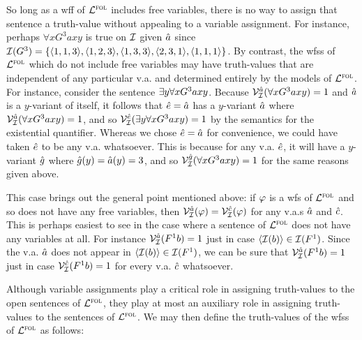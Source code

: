 So long as a wff of $\mathcal{L}^{\textsc{fol}}$ includes free variables, there is no way to assign that sentence a truth-value without appealing to a variable assignment.
For instance, perhaps $\forall xG^3axy$ is true on $\mathcal{I}$ given $\hat{a}$ since $\mathcal{I}(G^3)=\lbrace\langle1,1,3\rangle,\langle1,2,3\rangle,\langle1,3,3\rangle,\langle2,3,1\rangle,\langle1,1,1\rangle\rbrace$.
By contrast, the wfss of $\mathcal{L}^{\textsc{fol}}$ which do not include free variables may have truth-values that are independent of any particular v.a. and determined entirely by the models of $\mathcal{L}^{\textsc{fol}}$.
For instance, consider the sentence $\exists y\forall xG^3axy$.
Because $\mathcal{V}_{\mathcal{I}}^{\hat{a}}(\forall xG^3axy)=1$ and $\hat{a}$ is a $y$-variant of itself, it follows that $\hat{e}=\hat{a}$ has a $y$-variant $\hat{a}$ where $\mathcal{V}_{\mathcal{I}}^{\hat{a}}(\forall xG^3axy)=1$, and so $\mathcal{V}_{\mathcal{I}}^{\hat{e}}(\exists y\forall xG^3axy)=1$ by the semantics for the existential quantifier. 
Whereas we chose $\hat{e}=\hat{a}$ for convenience, we could have taken $\hat{e}$ to be any v.a. whatsoever. 
This is because for any v.a. $\hat{e}$, it will have a $y$-variant $\hat{g}$ where $\hat{g}(y)=\hat{a}(y)=3$, and so $\mathcal{V}_{\mathcal{I}}^{\hat{g}}(\forall xG^3axy)=1$ for the same reasons given above. 

This case brings out the general point mentioned above: if $\varphi$ is a wfs of $\mathcal{L}^{\textsc{fol}}$ and so does not have any free variables, then $\mathcal{V}_{\mathcal{I}}^{\hat{a}}(\varphi)=\mathcal{V}_{\mathcal{I}}^{\hat{c}}(\varphi)$ for any v.a.s $\hat{a}$ and $\hat{c}$.
This is perhaps easiest to see in the case where a sentence of $\mathcal{L}^{\textsc{fol}}$ does not have any variables at all.
For instance $\mathcal{V}_{\mathcal{I}}^{\hat{a}}(F^1b)=1$ just in case $\langle\mathcal{I}(b)\rangle\in\mathcal{I}(F^1)$.
Since the v.a. $\hat{a}$ does not appear in $\langle\mathcal{I}(b)\rangle\in\mathcal{I}(F^1)$, we can be sure that $\mathcal{V}_{\mathcal{I}}^{\hat{a}}(F^1b)=1$ just in case $\mathcal{V}_{\mathcal{I}}^{\hat{c}}(F^1b)=1$ for every v.a. $\hat{c}$ whatsoever.

Although variable assignments play a critical role in assigning truth-values to the open sentences of $\mathcal{L}^{\textsc{fol}}$, they play at most an auxiliary role in assigning truth-values to the sentences of $\mathcal{L}^{\textsc{fol}}$. 
We may then define the truth-values of the wfss of $\mathcal{L}^{\textsc{fol}}$ as follows:



